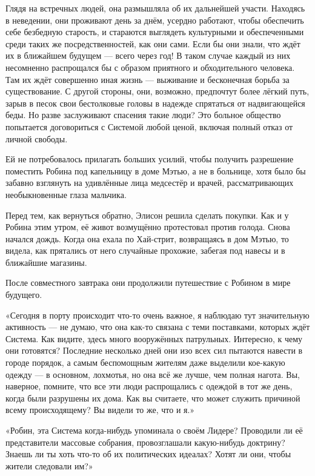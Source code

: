 \documentclass[a5paper, 9pt,
final, openany, twoside=true]{memoir}
\begin{document}
Глядя на встречных людей, она размышляла об их дальнейшей участи. Находясь в неведении, они проживают день за днём, усердно работают, чтобы обеспечить себе безбедную старость, и стараются выглядеть культурными и обеспеченными среди таких же посредственностей, как они сами. Если бы они знали, что ждёт их в ближайшем будущем — всего через год! В таком случае каждый из них несомненно распрощался бы с образом приятного и обходительного человека. Там их ждёт совершенно иная жизнь — выживание и бесконечная борьба за существование. С другой стороны, они, возможно, предпочтут более лёгкий путь, зарыв в песок свои бестолковые головы в надежде спрятаться от надвигающейся беды. Но разве заслуживают спасения такие люди? Это больное общество попытается договориться с Системой любой ценой, включая полный отказ от личной свободы.\bigskip

Ей не потребовалось прилагать больших усилий, чтобы получить разрешение поместить Робина под капельницу в доме Мэтью, а не в больнице, хотя было бы забавно взглянуть на удивлённые лица медсестёр и врачей, рассматривающих необыкновенные глаза мальчика.

Перед тем, как вернуться обратно, Элисон решила сделать покупки. Как и у Робина этим утром, её живот возмущённо протестовал против голода. Снова начался дождь. Когда она ехала по Хай-стрит, возвращаясь в дом Мэтью, то видела, как прятались от него случайные прохожие, забегая под навесы и в ближайшие магазины.

После совместного завтрака они продолжили путешествие с Робином в мире будущего.

«Сегодня в порту происходит что-то очень важное, я наблюдаю тут значительную активность — не думаю, что она как-то связана с теми поставками, которых ждёт Система. Как видите, здесь много вооружённых патрульных. Интересно, к чему они готовятся? Последние несколько дней они изо всех сил пытаются навести в городе порядок, а самым беспомощным жителям даже выделили кое-какую одежду — в основном, лохмотья, но она всё же лучше, чем полная нагота. Вы, наверное, помните, что все эти люди распрощались с одеждой в тот же день, когда были разрушены их дома. Как вы считаете, что может служить причиной всему происходящему? Вы видели то же, что и я.»\bigskip

«Робин, эта Система когда-нибудь упоминала о своём Лидере? Проводили ли её представители массовые собрания, провозглашали какую-нибудь доктрину? Знаешь ли ты хоть что-то об их политических идеалах? Хотят ли они, чтобы жители следовали им?»
\end{document}
